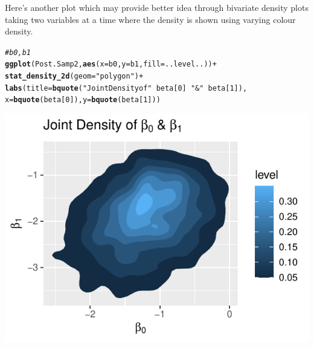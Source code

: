 \documentclass[11pt,english]{article}\usepackage[]{graphicx}\usepackage[]{xcolor}
\makeatletter
\def\maxwidth{ %
  \ifdim\Gin@nat@width>\linewidth
    \linewidth
  \else
    \Gin@nat@width
  \fi
}
\newcommand{\hlnum}[1]{\textcolor[rgb]{0.686,0.059,0.569}{#1}}%
\newcommand{\hlstr}[1]{\textcolor[rgb]{0.192,0.494,0.8}{#1}}%
\newcommand{\hlcom}[1]{\textcolor[rgb]{0.678,0.584,0.686}{\textit{#1}}}%
\newcommand{\hlopt}[1]{\textcolor[rgb]{0,0,0}{#1}}%
\newcommand{\hlstd}[1]{\textcolor[rgb]{0.345,0.345,0.345}{#1}}%
\newcommand{\hlkwc}[1]{\textcolor[rgb]{0.333,0.667,0.333}{#1}}%
\newcommand{\hlkwd}[1]{\textcolor[rgb]{0.737,0.353,0.396}{\textbf{#1}}}%
\newenvironment{kframe}{%
 \def\at@end@of@kframe{}%
 \ifinner\ifhmode%
  \def\at@end@of@kframe{\end{minipage}}%
  \begin{minipage}{\columnwidth}%
 \fi\fi%
 \def\FrameCommand##1{\hskip\@totalleftmargin \hskip-\fboxsep
 \colorbox{shadecolor}{##1}\hskip-\fboxsep
     \hskip-\linewidth \hskip-\@totalleftmargin \hskip\columnwidth}%
 \MakeFramed {\advance\hsize-\width
   \@totalleftmargin\z@ \linewidth\hsize
   \@setminipage}}%
 {\par\unskip\endMakeFramed%
 \at@end@of@kframe}
\newenvironment{knitrout}{}{} %
\makeatother
\begin{document}
Here's another plot which may provide better idea through bivariate
density plots taking two variables at a time where the density is
shown using varying colour density.
\begin{center}
\begin{knitrout}
\color{fgcolor}\begin{kframe}
\begin{alltt}
\hlcom{# b0,b1}
\hlkwd{ggplot}\hlstd{(Post.Samp2,} \hlkwd{aes}\hlstd{(}\hlkwc{x} \hlstd{= b0,} \hlkwc{y} \hlstd{= b1,} \hlkwc{fill} \hlstd{= ..level..))} \hlopt{+}
  \hlkwd{stat_density_2d}\hlstd{(}\hlkwc{geom} \hlstd{=} \hlstr{"polygon"}\hlstd{)} \hlopt{+}
\hlkwd{labs}\hlstd{(}\hlkwc{title} \hlstd{=} \hlkwd{bquote}\hlstd{(}\hlstr{"Joint Density of"} \hlopt{~} \hlstd{beta[}\hlnum{0}\hlstd{]} \hlopt{~} \hlstr{"&"} \hlopt{~} \hlstd{beta[}\hlnum{1}\hlstd{]),}
\hlkwc{x} \hlstd{=} \hlkwd{bquote}\hlstd{(beta[}\hlnum{0}\hlstd{]),} \hlkwc{y} \hlstd{=} \hlkwd{bquote}\hlstd{(beta[}\hlnum{1}\hlstd{]))}
\end{alltt}
\end{kframe}
\includegraphics[width=\maxwidth]{figure/unnamed-chunk-22-1} 
\end{knitrout}
\par\end{center}
\end{document}
